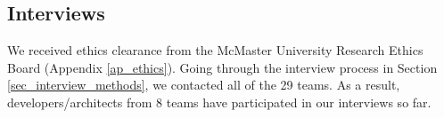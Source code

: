\subsection{Interviews}
\label{sec_apply_to_mi_interviews}
We received ethics clearance from the McMaster University Research Ethics Board (Appendix \ref{ap_ethics}). Going through the interview process in Section \ref{sec_interview_methods}, we contacted all of the 29 teams. As a result, developers/architects from 8 teams have participated in our interviews so far.
